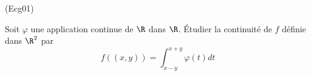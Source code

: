 \begin{tiny}(Ecg01)\end{tiny}
Soit $\varphi $ une application continue de $\R$ dans $\R$. \'Etudier la continuité de $f$ définie dans $\R^{2}$ par
\[f((x,y))=\int_{x-y}^{x+y}\varphi (t)dt\]
